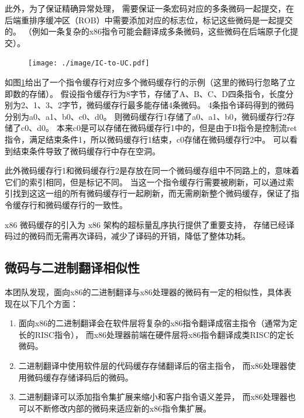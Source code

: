 此外，为了保证精确异常处理，
需要保证一条宏码对应的多条微码一起提交，在后端重排序缓冲区（ROB）中需要添加对应的标志位，标记这些微码是一起提交的。
（例如一条复杂的x86指令可能会翻译成多条微码，这些微码在后端原子化提交）。

\begin{figure}[!htbp]
  \centering
  \texttt{[image: ./image/IC-to-UC.pdf]}
  \label{img:IC_to_UC}
\end{figure}

如图\ref{img:IC_to_UC}给出了一个指令缓存行对应多个微码缓存行的示例（这里的微码行忽略了立即数的存储）。
假设指令缓存行为8字节，存储了A、B、C、D四条指令，长度分别为2、1、3、2字节，微码缓存行最多能存储4条微码。
4条指令译码得到的微码分别为a0、a1、b0、c0、d0。
则微码缓存行1存储了a0、a1、b0，微码缓存行2存储了c0、d0。
本来c0是可以存储在微码缓存行1中的，但是由于B指令是控制流ret指令，满足结束条件1，所以微码缓存行1结束，c0存储在微码缓存行2中。
可以看到结束条件导致了微码缓存行中存在空洞。

此外微码缓存行1和微码缓存行2是存放在同一个微码缓存组中不同路上的，意味着它们的索引相同，但是标记不同。
当这一个指令缓存行需要被刷新，可以通过索引找到这这一组的所有微码缓存行一起刷新，而无需刷新整个微码缓存，保证了指令缓存行和微码缓存行的一致性。

x86 微码缓存的引入为 x86 架构的超标量乱序执行提供了重要支持，
存储已经译码过的微码而无需再次译码，减少了译码的开销，降低了整体功耗。

\subsection{微码与二进制翻译相似性}

本团队发现，面向x86的二进制翻译与x86处理器的微码有一定的相似性，具体表现在以下几个方面：

\begin{enumerate}
\item 面向x86的二进制翻译会在软件层将复杂的x86指令翻译成宿主指令（通常为定长的RISC指令），
而x86处理器前端在硬件层将x86指令翻译成类RISC的定长微码。
\item 二进制翻译中使用软件层的代码缓存存储翻译后的宿主指令，
而x86处理器使用微码缓存存储译码后的微码。
\item 二进制翻译可以添加指令集扩展来缩小和客户指令语义差异，
而x86处理器也可以不断修改内部的微码来适应新的x86指令集扩展。
\end{enumerate}


